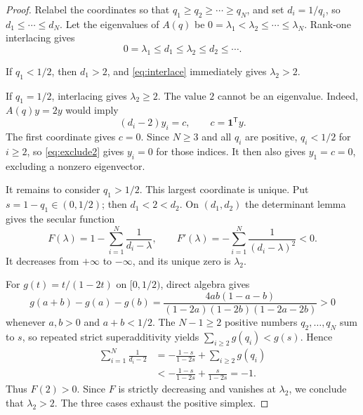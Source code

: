 \documentclass[11pt]{article}
\newcommand{\one}{\bm{1}}
\begin{document}
\begin{proof}
Relabel the coordinates so that $q_1\geq q_2\geq\cdots\geq q_N$, and set
$d_i=1/q_i$, so $d_1\leq\cdots\leq d_N$.  Let the eigenvalues of $A(q)$ be
$0=\lambda_1<\lambda_2\leq\cdots\leq\lambda_N$.  Rank-one interlacing gives
\begin{equation}
 0=\lambda_1\leq d_1\leq\lambda_2\leq d_2\leq\cdots .      \label{eq:interlace}
\end{equation}

If $q_1<1/2$, then $d_1>2$, and \eqref{eq:interlace} immediately gives
$\lambda_2>2$.

If $q_1=1/2$, interlacing gives $\lambda_2\geq2$.  The value $2$ cannot be an
eigenvalue.  Indeed, $A(q)y=2y$ would imply
\begin{equation}
 (d_i-2)y_i=c,\qquad c=\one^{\mathsf T}y.                    \label{eq:exclude2}
\end{equation}
The first coordinate gives $c=0$.  Since $N\geq3$ and all $q_i$ are positive,
$q_i<1/2$ for $i\geq2$, so \eqref{eq:exclude2} gives $y_i=0$ for those indices.
It then also gives $y_1=c=0$, excluding a nonzero eigenvector.

It remains to consider $q_1>1/2$.  This largest coordinate is unique.  Put
$s=1-q_1\in(0,1/2)$; then $d_1<2<d_2$.  On $(d_1,d_2)$ the determinant lemma
gives the secular function
\begin{equation}
 F(\lambda)=1-\sum_{i=1}^N\frac{1}{d_i-\lambda},
 \qquad F'(\lambda)=-\sum_{i=1}^N\frac{1}{(d_i-\lambda)^2}<0. \label{eq:secular}
\end{equation}
It decreases from $+\infty$ to $-\infty$, and its unique zero is $\lambda_2$.

For $g(t)=t/(1-2t)$ on $[0,1/2)$, direct algebra gives
\begin{equation}
 g(a+b)-g(a)-g(b)
 =\frac{4ab(1-a-b)}
 {(1-2a)(1-2b)(1-2a-2b)}>0                                 \label{eq:superadd}
\end{equation}
whenever $a,b>0$ and $a+b<1/2$.  The $N-1\geq2$ positive numbers
$q_2,\ldots,q_N$ sum to $s$, so repeated strict superadditivity yields
$\sum_{i\geq2}g(q_i)<g(s)$.  Hence
\begin{align}
 \sum_{i=1}^N\frac{1}{d_i-2}
 &=-\frac{1-s}{1-2s}+\sum_{i\geq2}g(q_i) \\
 &<-\frac{1-s}{1-2s}+\frac{s}{1-2s}=-1.                    \label{eq:F2}
\end{align}
Thus $F(2)>0$.  Since $F$ is strictly decreasing and vanishes at $\lambda_2$,
we conclude that $\lambda_2>2$.  The three cases exhaust the positive simplex.
\end{proof}
\end{document}
